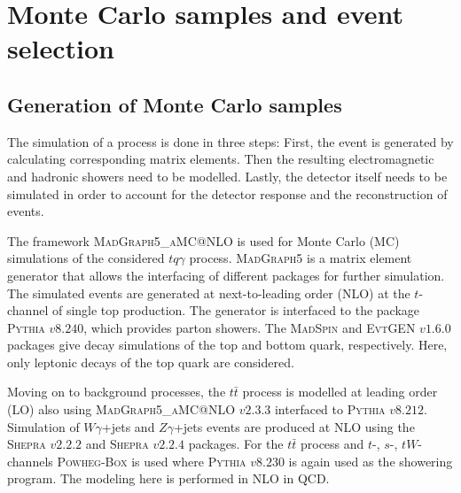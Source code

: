\chapter{Monte Carlo samples and event selection}


\section{Generation of Monte Carlo samples}
\label{sec:mc}

The simulation of a process is done in three steps: First, the event is generated by calculating corresponding matrix elements. Then the resulting electromagnetic and hadronic showers need to be modelled. Lastly, the detector itself needs to be simulated in order to account for the detector response and the reconstruction of events.

The framework \textsc{MadGraph5\_aMC@NLO} is used for Monte Carlo (MC) simulations of the considered $tq\gamma$ process. \textsc{MadGraph5} is a matrix element generator that allows the interfacing of different packages for further simulation. 
The simulated events are generated at next-to-leading order (NLO) at the $t$-channel of single top production. The generator is interfaced to the package \textsc{Pythia} $v8.240$, which provides parton showers. 
The \textsc{MadSpin} and \textsc{EvtGEN} $v1.6.0$ packages give decay simulations of the top and bottom quark, respectively. Here, only leptonic decays of the top quark are considered.

Moving on to background processes, the $t\bar{t}$ process is modelled at leading order (LO) also using \textsc{MadGraph5\_aMC@NLO} $v2.3.3$ interfaced to \textsc{Pythia} $v8.212$. 
Simulation of $W\gamma$+jets and $Z\gamma$+jets events are produced at NLO using the \textsc{Shepra} $v2.2.2$ and \textsc{Shepra} $v2.2.4$ packages. For the $t\bar{t}$ process and $t$-, $s$-, $tW$-channels 
\textsc{Powheg-Box} is used where \textsc{Pythia} $v8.230$ is again used as the showering program. The modeling here is performed in NLO in QCD. 

